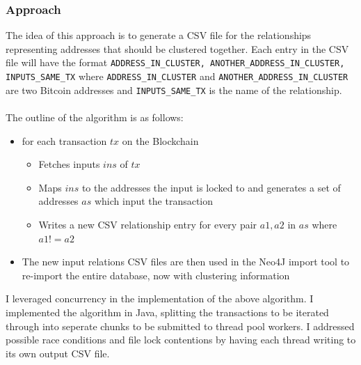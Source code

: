 \subsubsection{Approach}
The idea of this approach is to generate a CSV file for the relationships representing addresses that should be clustered together. Each entry in the CSV file will have the format \texttt{ADDRESS\_IN\_CLUSTER, ANOTHER\_ADDRESS\_IN\_CLUSTER, INPUTS\_SAME\_TX} where \texttt{ADDRESS\_IN\_CLUSTER} and \texttt{ANOTHER\_ADDRESS\_IN\_CLUSTER} are two Bitcoin addresses and \texttt{INPUTS\_SAME\_TX} is the name of the relationship. 
\\\\
The outline of the algorithm is as follows:
\begin{itemize}
    \item for each transaction $tx$ on the Blockchain
    \begin{itemize}
        \item Fetches inputs $ins$ of $tx$
        \item Maps $ins$ to the addresses the input is locked to and generates a set of addresses $as$ which input the transaction 
        \item Writes a new CSV relationship entry for every pair $a1, a2$ in $as$ where $a1 != a2$
    \end{itemize}
    \item The new input relations CSV files are then used in the Neo4J import tool to re-import the entire database, now with clustering information
\end{itemize}
I leveraged concurrency in the implementation of the above algorithm. I implemented the algorithm in Java, splitting the transactions to be iterated through into seperate chunks to be submitted to thread pool workers. I addressed possible race conditions and file lock contentions by having each thread writing to its own output CSV file.  

